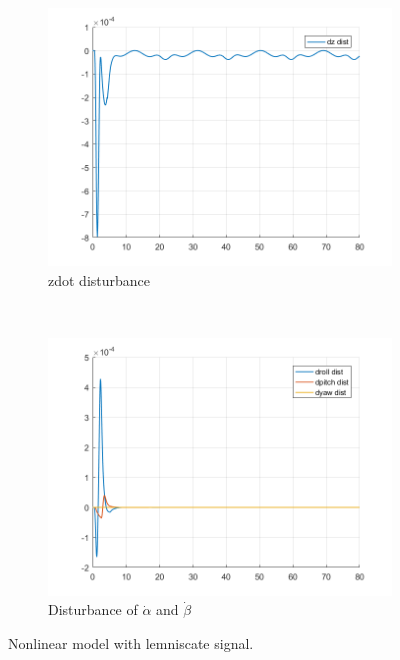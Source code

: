\documentclass[11pt]{article}
\begin{document}
\begin{enumerate}
\begin{figure}[ht]
        \begin{subfigure}[c]{0.3\linewidth}
            \centering
            \includegraphics[width=\linewidth]{Plots_13_NonlinearModel_Lemniscate/10}
            \caption{zdot disturbance}
        \end{subfigure}
        ~
        \begin{subfigure}[c]{0.3\linewidth}
            \centering
            \includegraphics[width=\linewidth]{Plots_13_NonlinearModel_Lemniscate/11}
            \caption{Disturbance of $\dot{\alpha}$ and $\dot{\beta}$}
        \end{subfigure}
        
        \caption{Nonlinear model with lemniscate signal.}
        \label{fig:nonlinear_model_lemniscate_signal}
\end{figure}
\end{enumerate}
\end{document}
